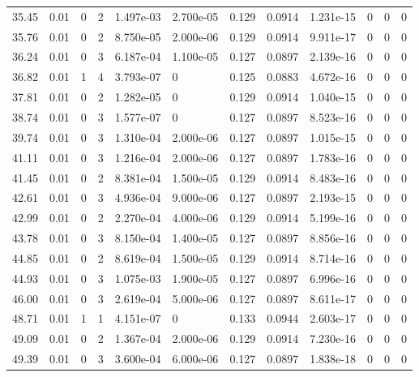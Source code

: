 \documentclass[preview]{standalone}
\begin{document}
{{{\begin{tabular}{L{1.2cm}C{1.2cm} C{0.3cm}C{0.5cm} C{1.4cm}C{1.4cm} C{1.4cm}C{1.4cm} C{1.6cm}C{1.6cm} C{1.6cm}C{1.6cm}}
  35.45  &  0.01  & 0     &  2 &  1.497e-03  & 2.700e-05  &  0.129&   0.0914& 1.231e-15 & 0   &  0 & 0  \\ 
  35.76  &  0.01  & 0     &  2 &  8.750e-05  & 2.000e-06  &  0.129&   0.0914& 9.911e-17 & 0   &  0 & 0  \\ 
  36.24  &  0.01  & 0     &  3 &  6.187e-04  & 1.100e-05  &  0.127&   0.0897& 2.139e-16 & 0   &  0 & 0  \\ 
  36.82  &  0.01  & 1     &  4 &  3.793e-07  & 0  &  0.125&   0.0883& 4.672e-16 & 0   &  0 & 0  \\ 
  37.81  &  0.01  & 0     &  2 &  1.282e-05  & 0  &  0.129&   0.0914& 1.040e-15 & 0   &  0 & 0  \\ 
  38.74  &  0.01  & 0     &  3 &  1.577e-07  & 0  &  0.127&   0.0897& 8.523e-16 & 0   &  0 & 0  \\ 
  39.74  &  0.01  & 0     &  3 &  1.310e-04  & 2.000e-06  &  0.127&   0.0897& 1.015e-15 & 0   &  0 & 0  \\ 
  41.11  &  0.01  & 0     &  3 &  1.216e-04  & 2.000e-06  &  0.127&   0.0897& 1.783e-16 & 0   &  0 & 0  \\ 
  41.45  &  0.01  & 0     &  2 &  8.381e-04  & 1.500e-05  &  0.129&   0.0914& 8.483e-16 & 0   &  0 & 0  \\ 
  42.61  &  0.01  & 0     &  3 &  4.936e-04  & 9.000e-06  &  0.127&   0.0897& 2.193e-15 & 0   &  0 & 0  \\ 
  42.99  &  0.01  & 0     &  2 &  2.270e-04  & 4.000e-06  &  0.129&   0.0914& 5.199e-16 & 0   &  0 & 0  \\ 
  43.78  &  0.01  & 0     &  3 &  8.150e-04  & 1.400e-05  &  0.127&   0.0897& 8.856e-16 & 0   &  0 & 0  \\ 
  44.85  &  0.01  & 0     &  2 &  8.619e-04  & 1.500e-05  &  0.129&   0.0914& 8.714e-16 & 0   &  0 & 0  \\ 
  44.93  &  0.01  & 0     &  3 &  1.075e-03  & 1.900e-05  &  0.127&   0.0897& 6.996e-16 & 0   &  0 & 0  \\ 
  46.00  &  0.01  & 0     &  3 &  2.619e-04  & 5.000e-06  &  0.127&   0.0897& 8.611e-17 & 0   &  0 & 0  \\ 
  48.71  &  0.01  & 1     &  1 &  4.151e-07  & 0  &  0.133&   0.0944& 2.603e-17 & 0   &  0 & 0  \\ 
  49.09  &  0.01  & 0     &  2 &  1.367e-04  & 2.000e-06  &  0.129&   0.0914& 7.230e-16 & 0   &  0 & 0  \\ 
  49.39  &  0.01  & 0     &  3 &  3.600e-04  & 6.000e-06  &  0.127&   0.0897& 1.838e-18 & 0   &  0 & 0  \\ 

\end{tabular}}}}
\end{document}
